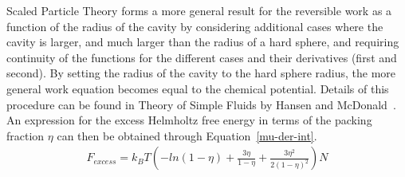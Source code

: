 \documentclass[double,12pt]{beavtex}
\begin{document}
Scaled Particle Theory forms a more general result for the reversible work 
as a function of the radius of the cavity by considering additional 
cases where the cavity is larger, and much larger than the radius of 
a hard sphere, and requiring continuity of the functions for the 
different cases and their derivatives (first and second). 
By setting the radius of the cavity to the hard sphere radius, the 
more general work equation becomes equal to the chemical potential. 
Details of this procedure can be found 
in Theory of Simple Fluids by Hansen and McDonald~\cite{Hansen}.  
An expression for the excess Helmholtz free energy in terms of the
packing fraction $\eta$ can then be obtained through 
Equation~\ref{mu-der-int}. 
%
%
%
\begin{align}\label{Fexcess-SPT}
    F_{excess}=k_BT\left(-ln(1-\eta)+\frac{3\eta}{1-\eta}+\frac{3{\eta}^2}{2(1-\eta)^2}\right)N
\end{align} 
\end{document}
